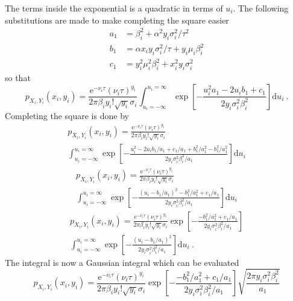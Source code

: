 \documentclass[12pt]{report}
\newcommand{\euler}{\mathrm{e}}
\newcommand{\diff}{\mathrm{d}}
\begin{document}
The terms inside the exponential is a quadratic in terms of $u_i$. The following substitutions are made to make completing the square easier
\begin{align}
a_1 &= \beta_i^2+\alpha^2y_i\sigma_i^2/\tau^2 \label{eq:appendix_a}\\
b_1 &= \alpha x_iy_i\sigma_i^2/\tau+y_i\mu_i\beta_i^2 \label{eq:appendix_b}\\
c_1 &= y_i^2\mu_i^2\beta_i^2+x_i^2y_i\sigma_i^2 \label{eq:appendix_c}
\end{align}
so that
\begin{equation*}
p_{X_i,Y_i}\left(x_i,y_i\right)=\frac{\euler^{-\nu_i\tau}(\nu_i\tau)^{y_i}}{2\pi\beta_iy_i!\sqrt{y_i}\sigma_i}\int_{u_i=-\infty}^{u_i=\infty}
\exp\left[-\frac{u_i^2a_1-2u_ib_1+c_1}{2y_i\sigma_i^2\beta_i^2}
\right] \diff u_i \ .
\end{equation*}
Completing the square is done by
\begin{multline*}
p_{X_i,Y_i}\left(x_i,y_i\right)=\frac{\euler^{-\nu_i\tau}(\nu_i\tau)^{y_i}}{2\pi\beta_iy_i!\sqrt{y_i}\sigma_i}
\\\int_{u_i=-\infty}^{u_i=\infty}
\exp\left[-\frac{u_i^2-2u_ib_1/a_1+c_1/a_1+b_1^2/a_1^2-b_1^2/a_1^2}{2y_i\sigma_i^2\beta_i^2/a_1}
\right] \diff u_i
\end{multline*}
\begin{multline*}
p_{X_i,Y_i}\left(x_i,y_i\right)=\frac{\euler^{-\nu_i\tau}(\nu_i\tau)^{y_i}}{2\pi\beta_iy_i!\sqrt{y_i}\sigma_i}
\\
\int_{u_i=-\infty}^{u_i=\infty}
\exp\left[-\frac{(u_i-b_1/a_1)^2-b_1^2/a_1^2+c_1/a_1}{2y_i\sigma_i^2\beta_i^2/a_1}
\right] \diff u_i
\end{multline*}
\begin{multline*}
p_{X_i,Y_i}\left(x_i,y_i\right)=\frac{\euler^{-\nu_i\tau}(\nu_i\tau)^{y_i}}{2\pi\beta_iy_i!\sqrt{y_i}\sigma_i}
\exp\left[-\frac{-b_1^2/a_1^2+c_1/a_1}{2y_i\sigma_i^2\beta_i^2/a_1}
\right]
\\
\int_{u_i=-\infty}^{u_i=\infty}
\exp\left[-\frac{(u_i-b_1/a_1)^2}{2y_i\sigma_i^2\beta_i^2/a_1}
\right] \diff u_i \ .
\end{multline*}
The integral is now a Gaussian integral which can be evaluated
\begin{equation*}
p_{X_i,Y_i}\left(x_i,y_i\right)=\frac{\euler^{-\nu_i\tau}(\nu_i\tau)^{y_i}}{2\pi\beta_iy_i!\sqrt{y_i}\sigma_i}
\exp\left[-\frac{-b_1^2/a_1^2+c_1/a_1}{2y_i\sigma_i^2\beta_i^2/a_1}
\right]
\sqrt{\frac{2\pi y_i\sigma_i^2\beta_i^2}{a_1}}
\end{equation*}
\end{document}
